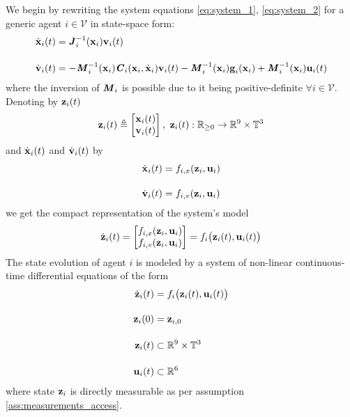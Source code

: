 We begin by rewriting the system equations \eqref{eq:system_1},
\eqref{eq:system_2} for a generic agent $i \in \mathcal{V}$ in state-space form:
\begin{subequations}
\begin{align}
  \dot{\bm{\mathbf{x}}}_i(t) &= \bm{\mathit{J}}_i^{-1}(\bm{\mathbf{x}}_i) \bm{\mathbf{v}}_i(t) \\[2.5ex]
  \dot{\bm{\mathbf{v}}}_i(t) &= -\bm{\mathit{M}}_i^{-1}(\bm{\mathbf{x}}_i)\bm{\mathit{C}}_i(\bm{\mathbf{x}}_i,\dot{\bm{\mathbf{x}}}_i) \bm{\mathbf{v}}_i(t)
    - \bm{\mathit{M}}_i^{-1}(\bm{\mathbf{x}}_i)\bm{\mathbf{g}}_i(\bm{\mathbf{x}}_i)
    + \bm{\mathit{M}}_i^{-1}(\bm{\mathbf{x}}_i)\bm{\mathbf{u}}_i(t)
\end{align}
\label{eq:state_space_system}
\end{subequations}
where the inversion of $\bm{\mathit{M}}_i$ is possible due to it being
positive-definite $\forall i \in \mathcal{V}$. Denoting by $\bm{\mathbf{z}}_i(t)$
\begin{align}
  \bm{\mathbf{z}}_i(t) \triangleq
    \begin{bmatrix}
      \bm{\mathbf{x}}_i(t) \\
      \bm{\mathbf{v}}_i(t)
    \end{bmatrix},\
    \bm{\mathbf{z}}_i(t) : \mathbb{R}_{\geq 0} \to \mathbb{R}^9 \times \mathbb{T}^3
\end{align}
and
$\dot{\bm{\mathbf{x}}}_i(t)$ and $\dot{\bm{\mathbf{v}}}_i(t)$ by
\begin{subequations}
\begin{align}
  \dot{\bm{\mathbf{x}}}_i(t) &= f_{i,x}(\bm{\mathbf{z}}_i, \bm{\mathbf{u}}_i) \\[2.5ex]
  \dot{\bm{\mathbf{v}}}_i(t) &= f_{i,v}(\bm{\mathbf{z}}_i, \bm{\mathbf{u}}_i)
\end{align}
\end{subequations}
we get the compact representation of the system's model
\begin{align}
  \dot{\bm{\mathbf{z}}}_i(t) =
    \begin{bmatrix}
      f_{i,x}(\bm{\mathbf{z}}_i, \bm{\mathbf{u}}_i) \\
      f_{i,v}(\bm{\mathbf{z}}_i, \bm{\mathbf{u}}_i)
    \end{bmatrix} =
 f_i \big(\bm{\mathbf{z}}_i (t), \bm{\mathbf{u}}_i (t)\big)
\end{align}
The state evolution of agent $i$ is modeled by a system of non-linear
continuous-time differential equations of the form
\begin{align}
  \dot{\bm{\mathbf{z}}}_i(t) &= f_i \big(\bm{\mathbf{z}}_i (t), \bm{\mathbf{u}}_i (t)\big) \label{eq:non_perturbed_system}\\[2.5ex]
  \bm{\mathbf{z}}_i(0) &= \bm{\mathbf{z}}_{i,0} \\[2.5ex]
  \bm{\mathbf{z}}_i (t) & \subset \mathbb{R}^{9} \times \mathbb{T}^3 \\[2.5ex]
  \bm{\mathbf{u}}_i (t) & \subset \mathbb{R}^6
  \label{eq:original_z_system}
\end{align}
where state $\bm{\mathbf{z}}_i$ is directly measurable as per assumption
\eqref{ass:measurements_access}.

